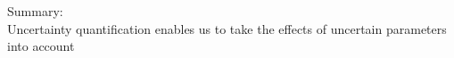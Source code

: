 \documentclass[presentation]{beamer}
\begin{document}
\begin{frame}{{\normalsize Summary:} \\ Uncertainty quantification enables us to take the
  effects of uncertain parameters into account}
  \pause

\end{frame}
\end{document}
